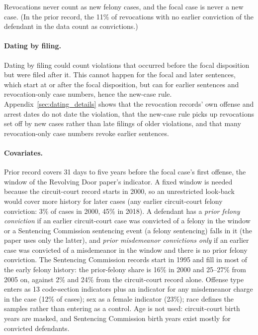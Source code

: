 \documentclass[11pt]{article}
\begin{document}
Revocations never count as new felony cases, and the focal case is never a new case. (In the prior record, the 11\% of revocations with no earlier conviction of the defendant in the data count as convictions.)

\paragraph{Dating by filing.} Dating by filing could count violations that occurred before the focal disposition but were filed after it. This cannot happen for the focal and later sentences, which start at or after the focal disposition, but can for earlier sentences and revocation-only case numbers, hence the new-case rule. Appendix~\ref{sec:dating_details} shows that the revocation records' own offense and arrest dates do not date the violation, that the new-case rule picks up revocations set off by new cases rather than late filings of older violations, and that many revocation-only case numbers revoke earlier sentences.

\paragraph{Covariates.} Prior record covers 31 days to five years before the focal case's first offense, the window of the Revolving Door paper's indicator. A fixed window is needed because the circuit-court record starts in 2000, so an unrestricted look-back would cover more history for later cases (any earlier circuit-court felony conviction: 3\% of cases in 2000, 45\% in 2018). A defendant has a \emph{prior felony conviction} if an earlier circuit-court case was convicted of a felony in the window or a Sentencing Commission sentencing event (a felony sentencing) falls in it (the paper uses only the latter), and \emph{prior misdemeanor convictions only} if an earlier case was convicted of a misdemeanor in the window and there is no prior felony conviction. The Sentencing Commission records start in 1995 and fill in most of the early felony history: the prior-felony share is 16\% in 2000 and 25--27\% from 2005 on, against 2\% and 24\% from the circuit-court record alone. Offense type enters as 13 code-section indicators plus an indicator for any misdemeanor charge in the case (12\% of cases); sex as a female indicator (23\%); race defines the samples rather than entering as a control. Age is not used: circuit-court birth years are masked, and Sentencing Commission birth years exist mostly for convicted defendants.
\end{document}

